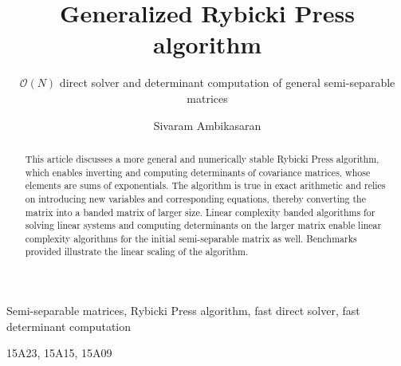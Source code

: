 \documentclass[final,leqno]{siamltex}
\title{Generalized Rybicki Press algorithm}
\subtitle{$\mathcal{O}(N)$ direct solver and determinant computation of general semi-separable matrices}
\author{Sivaram Ambikasaran}
\begin{document}
\maketitle

\begin{abstract}
This article discusses a more general and numerically stable Rybicki Press algorithm, which enables inverting and computing determinants of covariance matrices, whose elements are sums of exponentials. The algorithm is true in exact arithmetic and relies on introducing new variables and corresponding equations, thereby converting the matrix into a banded matrix of larger size. Linear complexity banded algorithms for solving linear systems and computing determinants on the larger matrix enable linear complexity algorithms for the initial semi-separable matrix as well. Benchmarks provided illustrate the linear scaling of the algorithm.
\end{abstract}

\begin{keywords}
Semi-separable matrices, Rybicki Press algorithm, fast direct solver, fast determinant computation
\end{keywords}


\begin{AMS}
15A23, 15A15, 15A09
\end{AMS}

\pagestyle{myheadings}
\thispagestyle{plain}
\end{document}
